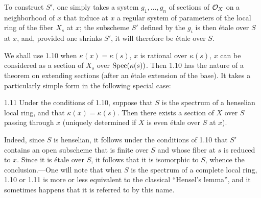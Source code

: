 To construct $S'$, one simply takes a system $g_1,\ldots,g_n$ of sections of $\mathcal{O}_X$ on a neighborhood of $x$ that induce at $x$ a regular system of parameters of the local ring of the fiber $X_s$ at $x$; the subscheme $S'$ defined by the $g_i$ is then étale over $S$ at $x$, and, provided one shrinks $S'$, it will therefore be étale over $S$.

We shall use 1.10 when $\kappa(x)=\kappa(s)$, \ie $x$ is rational over $\kappa(s)$, \ie $x$ can be considered as a section of $X_s$ over $\operatorname{Spec}(\kappa(s))$. Then 1.10 has the nature of a theorem on extending sections (after an étale extension of the base). It takes a particularly simple form in the following special case:
\begin{corollary}{1.11}\label{XI.1.11}
Under the conditions of 1.10, suppose that $S$ is the spectrum of a henselian local ring, and that $\kappa(x)=\kappa(s)$. Then there exists a section of $X$ over $S$ passing through $x$ (uniquely determined if $X$ is even étale over $S$ at $x$).
\end{corollary}
Indeed, since $S$ is henselian, it follows under the conditions of 1.10 that $S'$ contains an open subscheme that is finite over $S$ and whose fiber at $s$ is reduced to $x$. Since it is étale over $S$, it follows that it is isomorphic to $S$, whence the conclusion.---One will note that when $S$ is the spectrum of a complete local ring, 1.10 or 1.11 is more or less equivalent to the classical ``Hensel's lemma'', and it sometimes happens that it is referred to by this name.


